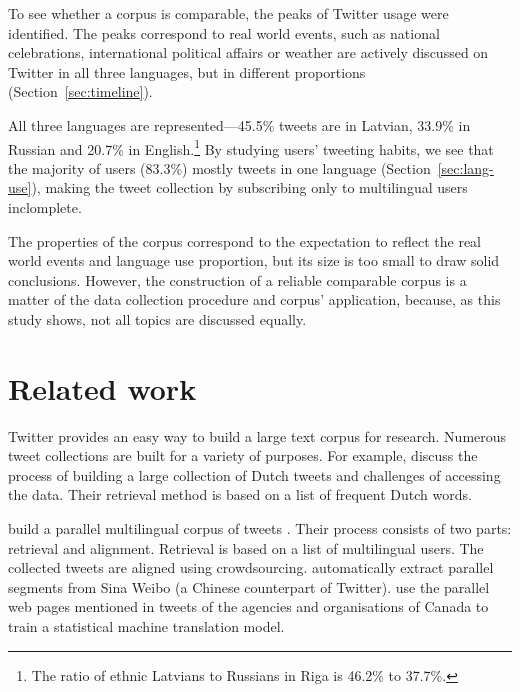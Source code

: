 \documentclass[11pt,a4paper]{article}
\begin{document}
To see whether a corpus is comparable, the peaks of Twitter usage were identified. The peaks correspond to real world events, such as national celebrations, international political affairs or weather are actively discussed on Twitter in all three languages, but in different proportions (Section~\ref{sec:timeline}).

All three languages are represented---45.5\% tweets are in Latvian, 33.9\% in Russian and 20.7\% in English.\footnote{
The ratio of ethnic Latvians to Russians in Riga is 46.2\% to 37.7\%.}
By studying users' tweeting habits, we see that the majority of users (83.3\%) mostly tweets in one language (Section~\ref{sec:lang-use}), making the tweet collection by subscribing only to multilingual users inclomplete.

The properties of the corpus correspond to the expectation to reflect the real world events and language use proportion, but its size is too small to draw solid conclusions. However, the construction of a reliable comparable corpus is a matter of the data collection procedure and corpus' application, because, as this study shows, not all topics are discussed equally.


\section{Related work}

Twitter %
provides an easy way to build a large text corpus for research. Numerous tweet collections are built for a variety of purposes. For example, \citet{sang2013} discuss the process of building a large collection of Dutch tweets and challenges of accessing the data. %
Their retrieval method is based on a list of frequent Dutch words.

\citet{SANVICENTE16.465} build a parallel multilingual corpus of tweets%
. Their process consists of two parts: retrieval and alignment. Retrieval is based on a list of multilingual users. The collected tweets are aligned using crowdsourcing. \citet{ling-EtAl:2013:ACL2013} automatically extract parallel segments from Sina Weibo (a Chinese counterpart of Twitter).
%
\citet{gotti-langlais-farzindar:2013:LASM} use the parallel web pages mentioned in tweets of the agencies and organisations of Canada to train a statistical machine translation model.
\end{document}
